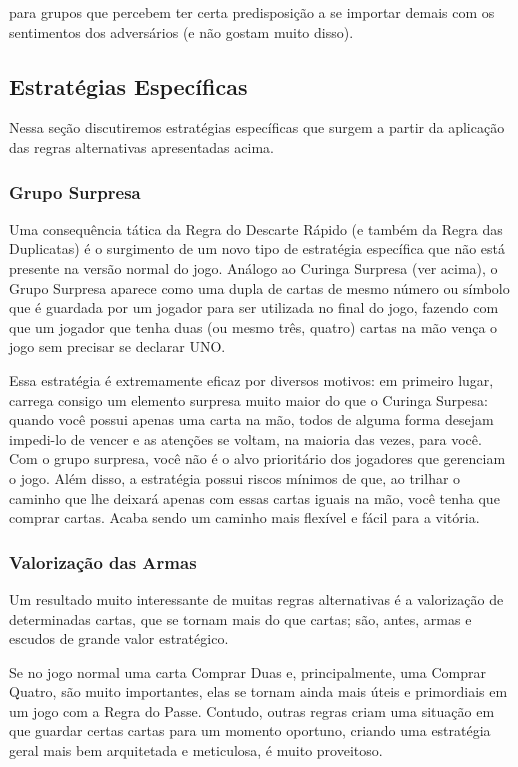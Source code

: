para grupos que percebem ter certa predisposição a se importar demais com os sentimentos dos adversários (e não gostam muito disso).

\subsection{Estratégias Específicas}

Nessa seção discutiremos estratégias específicas que surgem a partir da aplicação das regras alternativas apresentadas acima.

\subsubsection{Grupo Surpresa}

Uma consequência tática da Regra do Descarte Rápido (e também da Regra das Duplicatas) é o surgimento de um novo tipo de estratégia específica que não está presente na versão normal do jogo. Análogo ao Curinga Surpresa (ver acima), o Grupo Surpresa aparece como uma dupla de cartas de mesmo número ou símbolo que é guardada por um jogador para ser utilizada no final do jogo, fazendo com que um jogador que tenha duas (ou mesmo três, quatro) cartas na mão vença o jogo sem precisar se declarar UNO.

Essa estratégia é extremamente eficaz por diversos motivos: em primeiro lugar, carrega consigo um elemento surpresa muito maior do que o Curinga Surpesa: quando você possui apenas uma carta na mão, todos de alguma forma desejam impedi-lo de vencer e as atenções se voltam, na maioria das vezes, para você. Com o grupo surpresa, você não é o alvo prioritário dos jogadores que gerenciam o jogo. Além disso, a estratégia possui riscos mínimos de que, ao trilhar o caminho que lhe deixará apenas com essas cartas iguais na mão, você tenha que comprar cartas. Acaba sendo um caminho mais flexível e fácil para a vitória.

\subsubsection{Valorização das Armas}

Um resultado muito interessante de muitas regras alternativas é a valorização de determinadas cartas, que se tornam mais do que cartas; são, antes, armas e escudos de grande valor estratégico.

Se no jogo normal uma carta Comprar Duas e, principalmente, uma Comprar Quatro, são muito importantes, elas se tornam ainda mais úteis e primordiais em um jogo com a Regra do Passe. Contudo, outras regras criam uma situação em que guardar certas cartas para um momento oportuno, criando uma estratégia geral mais bem arquitetada e meticulosa, é muito proveitoso.

